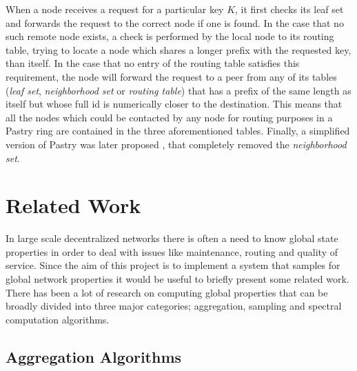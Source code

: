 \documentclass[a4paper,11pt,twoside]{report}
\begin{document}
When a node receives a request for a particular key $K$, it first checks its leaf set and forwards the request to the correct node if one is found. In the case that no such remote node exists, a check is performed by the local node to its routing table, trying to locate a node which shares a longer prefix with the requested key, than itself. In the case that no entry of the routing table satisfies this requirement, the node will forward the request to a peer from any of its tables (\textit{leaf set}, \textit{neighborhood set} or \textit{routing table}) that has a prefix of the same length as itself but whose full id is numerically closer to the destination. This means that all the nodes which could be contacted by any node for routing purposes in a Pastry ring are contained in the three aforementioned tables. Finally, a simplified version of Pastry was later proposed \cite{Castro:2003:TRS:1809315.1809337}, that completely removed the  \textit{neighborhood set}.


\section{Related Work}

In large scale decentralized networks there is often a need to know global state properties in order to deal with issues like maintenance, routing and quality of service. Since the aim of this project is to implement a system that samples for global network properties it would be useful to briefly present some related work. There has been a lot of research on computing global properties that can be broadly divided into three major categories; aggregation, sampling and spectral computation algorithms.

\subsection{Aggregation Algorithms}
\label{sec:aggregation_alg}
\end{document}
